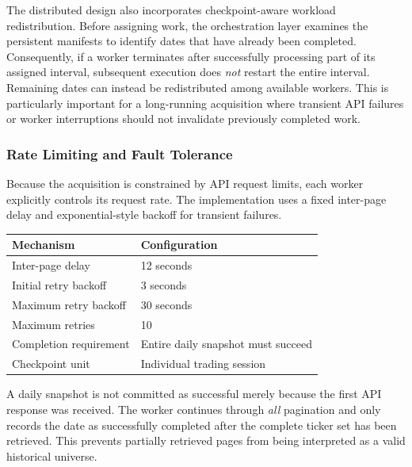 \medskip

The distributed design also incorporates checkpoint-aware workload redistribution. Before assigning work, the orchestration layer examines the persistent manifests to identify dates that have already been completed. Consequently, if a worker terminates after successfully processing part of its assigned interval, subsequent execution does \emph{not} restart the entire interval. Remaining dates can instead be redistributed among available workers. This is particularly important for a long-running acquisition where transient \acs{API} failures or worker interruptions should not invalidate previously completed work.

\subsubsection*{Rate Limiting and Fault Tolerance}
Because the acquisition is constrained by \acs{API} request limits, each worker explicitly controls its request rate. The implementation uses a fixed inter-page delay and exponential-style backoff for transient failures.

\begin{center}
    \small
    \begin{tabular}{ll}
        \toprule
        \textbf{Mechanism}     & \textbf{Configuration}             \\
        \midrule
        Inter-page delay       & 12 seconds                         \\
        Initial retry backoff  & 3 seconds                          \\
        Maximum retry backoff  & 30 seconds                         \\
        Maximum retries        & 10                                 \\
        Completion requirement & Entire daily snapshot must succeed \\
        Checkpoint unit        & Individual trading session         \\
        \bottomrule
    \end{tabular}
\end{center}

A daily snapshot is not committed as successful merely because the first \acs{API} response was received. The worker continues through \emph{all} pagination and only records the date as successfully completed after the complete ticker set has been retrieved. This prevents partially retrieved pages from being interpreted as a valid historical universe.

